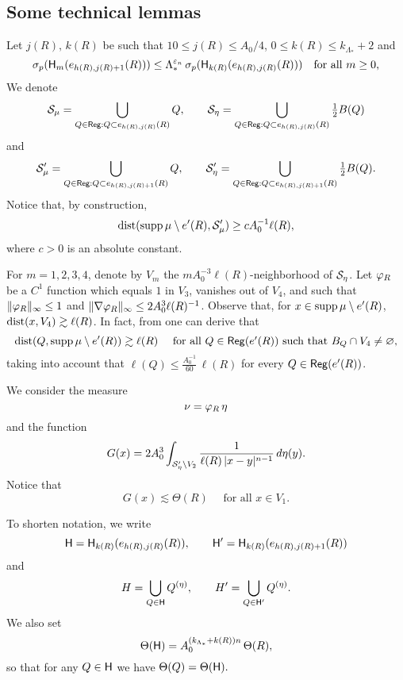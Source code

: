
\subsection{Some technical lemmas}\label{subsec9.5}


Let $j(R),\,k(R)$ be such that $10\leq j(R)\leq A_0/4$,  $0\leq k(R)\leq k_{\Lambda_*}+2$ and
$$
\sigma_p({\mathsf{H}}_{m}(e_{h(R),j(R)+1}(R))) \leq \Lambda_*^{{\varepsilon}_n} \,\sigma_p({\mathsf{H}}_{k(R)}(e_{h(R),j(R)}(R)))
\quad \mbox{for all $m\geq0$,}
$$
We denote
$${\mathcal S}_\mu = \bigcup_{Q\in{\mathsf{Reg}}:Q\subset e_{h(R),j(R)}(R)} Q,\qquad
{\mathcal S}_\eta = \bigcup_{Q\in{\mathsf{Reg}}:Q\subset e_{h(R),j(R)}(R)} \tfrac12B(Q)$$
and
$${\mathcal S}_\mu' = \bigcup_{Q\in{\mathsf{Reg}}:Q\subset e_{h(R),j(R)+1}(R)} Q,\qquad
{\mathcal S}_\eta' = \bigcup_{Q\in{\mathsf{Reg}}:Q\subset e_{h(R),j(R)+1}(R)} \tfrac12B(Q).$$
Notice that, by construction,
\begin{equation}\label{eqtec732}
{\rm dist}(\operatorname{supp}\mu \setminus e'(R),{\mathcal S}_\mu')\geq cA_0^{-1} \ell(R),
\end{equation}
where $c>0$ is an absolute constant.

For $m=1,2,3,4$, denote by $V_m$ the $m A_0^{-3}\ell(R)$-neighborhood of ${\mathcal S}_\eta$.
Let ${\varphi}_R$ be a $C^1$ function which equals $1$ in $V_3$, vanishes out of $V_4$, and such that $\|{\varphi}_R\|_\infty\leq 1$ and
$\|\nabla{\varphi}_R\|_\infty\leq 2A_0^3 \ell(R)^{-1}$.
Observe that, for $x\in \operatorname{supp}\mu\setminus e'(R)$, ${\rm dist}(x,V_4)\gtrsim \ell(R)$.
In fact, from  one can derive that
\begin{equation}\label{eqtec733}
{\rm dist}(Q,\operatorname{supp}\mu\setminus e'(R)) \gtrsim \ell(R)\quad\mbox{ for all $Q\in{\mathsf{Reg}}(e'(R))$ such that
$B_Q\cap V_4\neq\varnothing$,}
\end{equation}
taking into account that $\ell(Q)\leq \frac{A_0^{-1}}{60}\,\ell(R)$ for every $Q\in{\mathsf{Reg}}(e'(R))$.

 We consider the measure
$$\nu = {\varphi}_R\,\eta$$
and the function
$$G(x) = 2A_0^3\int_{{\mathcal S}_\eta'\setminus V_2} 
 \frac1{\ell(R)\,|x-y|^{n-1}}\,d\eta(y).$$
 Notice that
$$G(x)\lesssim \Theta(R)\quad\mbox{ for all $x\in V_1$.}$$ 


To shorten notation, we write
$${\mathsf{H}}= {\mathsf{H}}_{k(R)}(e_{h(R),j(R)}(R)),\qquad {\mathsf{H}}'= {\mathsf{H}}_{k(R)}(e_{h(R),j(R)+1}(R))$$
and
$$H= \bigcup_{Q\in{\mathsf{H}}} Q^{(\eta)},\qquad  H'= \bigcup_{Q\in{\mathsf{H}}'}Q^{(\eta)}.$$
We also set
$$\Theta({\mathsf{H}}) = A_0^{(k_{\Lambda_*}+k(R))n}\,\Theta(R),$$
so that for any $Q\in{\mathsf{H}}$ we have
$\Theta(Q) = \Theta({\mathsf{H}}).$


